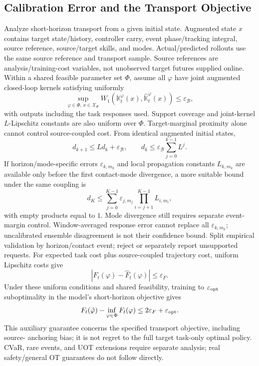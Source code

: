 \documentclass[11pt]{article}
\begin{document}
\subsection{Calibration Error and the Transport Objective}
Analyze short-horizon transport from a given initial state. Augmented state $x$ contains
target state/history, controller carry, event phase/tracking integral, source reference,
source/target skills, and modes. Actual/predicted rollouts use the same source reference
and transport sample. Source references are analysis/training-cost variables, not
unobserved target futures supplied online. Within a shared feasible parameter set
$\Phi$, assume all $\varphi$ have joint augmented closed-loop kernels satisfying uniformly
\begin{equation}
 \sup_{\varphi\in\Phi,\,x\in\mathcal X_\Phi}
 W_1(\mathbb K_t^\varphi(x),\widehat{\mathbb K}_t^\varphi(x))
 \le\varepsilon_{\mathcal B},
\end{equation}
with outputs including the task responses used. Support coverage and joint-kernel
$L$-Lipschitz constants are also uniform over $\Phi$. Target-marginal proximity alone
cannot control source-coupled cost. From identical augmented initial states,
\begin{equation}
 d_{k+1}\le Ld_k+\varepsilon_{\mathcal B},\qquad
 d_k\le\varepsilon_{\mathcal B}\sum_{j=0}^{k-1}L^j.
 \label{eq:propagation}
\end{equation}
If horizon/mode-specific errors $\varepsilon_{k,m_k}$ and local propagation constants
$L_{k,m_k}$ are available only before the first contact-mode divergence, a more suitable
bound under the same coupling is
\begin{equation}
 d_K\le\sum_{j=0}^{K-1}\varepsilon_{j,m_j}
       \prod_{i=j+1}^{K-1}L_{i,m_i},
 \label{eq:mode-local-propagation}
\end{equation}
with empty products equal to $1$. Mode divergence still requires separate event-margin
control. Window-averaged response error cannot replace all $\varepsilon_{k,m_k}$;
uncalibrated ensemble disagreement is not their confidence bound. Split empirical
validation by horizon/contact event; reject or separately report unsupported requests.
For expected task cost plus source-coupled trajectory cost, uniform Lipschitz costs give
\begin{equation}
 |F_t(\varphi)-\widehat F_t(\varphi)|\le\varepsilon_F.
\end{equation}
Under these uniform conditions and shared feasibility, training to
$\varepsilon_{\rm opt}$ suboptimality in the model's short-horizon objective gives
\begin{equation}
 F_t(\hat\varphi)-\inf_{\varphi\in\Phi}F_t(\varphi)
 \le2\varepsilon_F+\varepsilon_{\rm opt}.
 \label{eq:objectivebound}
\end{equation}
This auxiliary guarantee concerns the specified transport objective, including source-
anchoring bias; it is not regret to the full target task-only optimal policy. CVaR,
rare events, and UOT extensions require separate analysis; real safety/general OT
guarantees do not follow directly.
\end{document}
